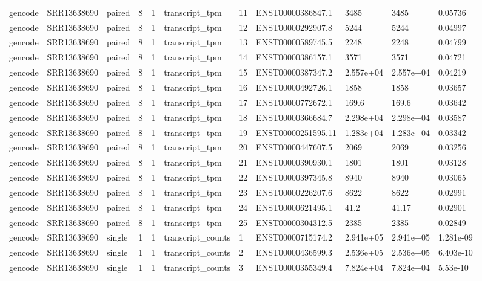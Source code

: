 \begin{tabular}{lllllllllll}
gencode & SRR13638690 & paired & 8 & 1 & transcript\_tpm & 11 & ENST00000386847.1 & 3485 & 3485 & 0.05736 \\
gencode & SRR13638690 & paired & 8 & 1 & transcript\_tpm & 12 & ENST00000292907.8 & 5244 & 5244 & 0.04997 \\
gencode & SRR13638690 & paired & 8 & 1 & transcript\_tpm & 13 & ENST00000589745.5 & 2248 & 2248 & 0.04799 \\
gencode & SRR13638690 & paired & 8 & 1 & transcript\_tpm & 14 & ENST00000386157.1 & 3571 & 3571 & 0.04721 \\
gencode & SRR13638690 & paired & 8 & 1 & transcript\_tpm & 15 & ENST00000387347.2 & 2.557e+04 & 2.557e+04 & 0.04219 \\
gencode & SRR13638690 & paired & 8 & 1 & transcript\_tpm & 16 & ENST00000492726.1 & 1858 & 1858 & 0.03657 \\
gencode & SRR13638690 & paired & 8 & 1 & transcript\_tpm & 17 & ENST00000772672.1 & 169.6 & 169.6 & 0.03642 \\
gencode & SRR13638690 & paired & 8 & 1 & transcript\_tpm & 18 & ENST00000366684.7 & 2.298e+04 & 2.298e+04 & 0.03587 \\
gencode & SRR13638690 & paired & 8 & 1 & transcript\_tpm & 19 & ENST00000251595.11 & 1.283e+04 & 1.283e+04 & 0.03342 \\
gencode & SRR13638690 & paired & 8 & 1 & transcript\_tpm & 20 & ENST00000447607.5 & 2069 & 2069 & 0.03256 \\
gencode & SRR13638690 & paired & 8 & 1 & transcript\_tpm & 21 & ENST00000390930.1 & 1801 & 1801 & 0.03128 \\
gencode & SRR13638690 & paired & 8 & 1 & transcript\_tpm & 22 & ENST00000397345.8 & 8940 & 8940 & 0.03065 \\
gencode & SRR13638690 & paired & 8 & 1 & transcript\_tpm & 23 & ENST00000226207.6 & 8622 & 8622 & 0.02991 \\
gencode & SRR13638690 & paired & 8 & 1 & transcript\_tpm & 24 & ENST00000621495.1 & 41.2 & 41.17 & 0.02901 \\
gencode & SRR13638690 & paired & 8 & 1 & transcript\_tpm & 25 & ENST00000304312.5 & 2385 & 2385 & 0.02849 \\
gencode & SRR13638690 & single & 1 & 1 & transcript\_counts & 1 & ENST00000715174.2 & 2.941e+05 & 2.941e+05 & 1.281e-09 \\
gencode & SRR13638690 & single & 1 & 1 & transcript\_counts & 2 & ENST00000436599.3 & 2.536e+05 & 2.536e+05 & 6.403e-10 \\
gencode & SRR13638690 & single & 1 & 1 & transcript\_counts & 3 & ENST00000355349.4 & 7.824e+04 & 7.824e+04 & 5.53e-10 \\

\end{tabular}
